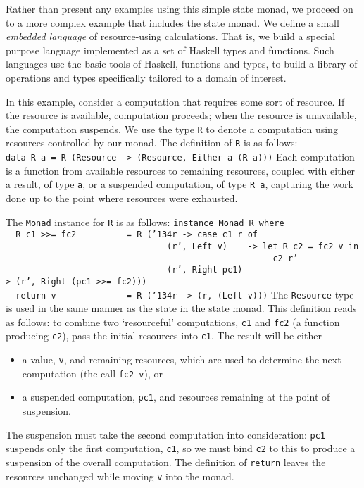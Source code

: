 Rather than present any examples using this simple state monad, we
proceed on to a more complex example that includes the state monad.
We define a small {\em embedded language} of resource-using
calculations. 
That is, we build a special purpose language implemented as a set of Haskell
types and functions.  Such languages use the basic tools of Haskell,
functions and types, to build a library of operations
and types specifically tailored to a domain of interest.

In this example, consider a computation that requires some sort of
resource.  If the resource is available, computation proceeds; when the
resource is unavailable, the computation suspends.  We use the type \mbox{\tt R}
to denote a computation using resources controlled by our monad.
The definition of \mbox{\tt R} is as follows:
\bprog
\mbox{\tt data\ R\ a\ =\ R\ (Resource\ ->\ (Resource,\ Either\ a\ (R\ a)))}
\eprog
Each computation is a function from available resources to remaining
resources, coupled with either a result, of type \mbox{\tt a}, or a
suspended computation, of type \mbox{\tt R\ a}, capturing the work done up
to the point where resources were exhausted.

The \mbox{\tt Monad} instance for \mbox{\tt R} is as follows:
\bprog
\mbox{\tt instance\ Monad\ R\ where}\\
\mbox{\tt \ \ R\ c1\ >>=\ fc2\ \ \ \ \ \ \ \ \ \ =\ R\ ({\char'134}r\ ->\ case\ c1\ r\ of}\\
\mbox{\tt \ \ \ \ \ \ \ \ \ \ \ \ \ \ \ \ \ \ \ \ \ \ \ \ \ \ \ \ \ \ \ \ (r',\ Left\ v)\ \ \ \ ->\ let\ R\ c2\ =\ fc2\ v\ in}\\
\mbox{\tt \ \ \ \ \ \ \ \ \ \ \ \ \ \ \ \ \ \ \ \ \ \ \ \ \ \ \ \ \ \ \ \ \ \ \ \ \ \ \ \ \ \ \ \ \ \ \ \ \ \ \ \ \ c2\ r'}\\
\mbox{\tt \ \ \ \ \ \ \ \ \ \ \ \ \ \ \ \ \ \ \ \ \ \ \ \ \ \ \ \ \ \ \ \ (r',\ Right\ pc1)\ ->\ (r',\ Right\ (pc1\ >>=\ fc2)))}\\
\mbox{\tt \ \ return\ v\ \ \ \ \ \ \ \ \ \ \ \ \ \ =\ R\ ({\char'134}r\ ->\ (r,\ (Left\ v)))}
\eprog
The \mbox{\tt Resource} type is used in the same manner as the state in
the state monad.  This definition reads as follows: to combine two
`resourceful' computations, \mbox{\tt c1} and \mbox{\tt fc2} (a function producing
\mbox{\tt c2}), pass the initial resources into \mbox{\tt c1}.  The result will be
either
\begin{itemize}
\item a value, \mbox{\tt v}, and remaining resources, which are used to determine
the next computation (the call \mbox{\tt fc2\ v}), or
\item a suspended computation, \mbox{\tt pc1}, and resources remaining at the
point of suspension.  
\end{itemize}
The suspension must take the second computation into consideration:
\mbox{\tt pc1} suspends only the first computation, \mbox{\tt c1}, so we must bind \mbox{\tt c2}
to this to produce a suspension of the overall computation.
The definition of \mbox{\tt return} leaves the resources unchanged while moving
\mbox{\tt v} into the monad.

